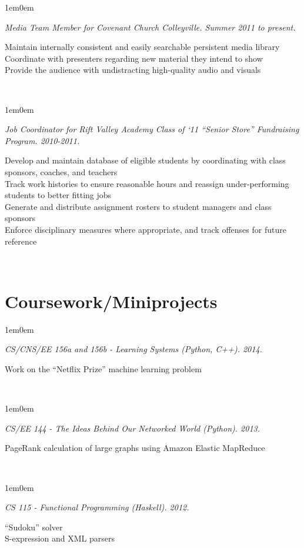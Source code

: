 \documentclass[10pt,letterpaper, full]{article}
\newcommand{\pjtitle}[1]{\renewcommand{\givenpjtitle}{#1}}
\newcommand{\pjtime}[1]{\renewcommand{\givenpjtime}{#1}}
\newcommand{\pjbody}[1]{\renewcommand{\givenpjbody}{#1}}
\newcommand{\givenpjtitle}{REQUIRED!}
\newcommand{\givenpjtime}{REQUIRED!}
\newcommand{\givenpjbody}{REQUIRED!}
\newenvironment{projectenv}
    {
        \begin{adjustwidth}{1em}{0em}
    }
    {
        \textit{\givenpjtitle. \givenpjtime.}

        \begin{minipage}[l]{\textwidth}
            \givenpjbody%
        \end{minipage}\\%


        \end{adjustwidth}
    }
\begin{document}
\begin{projectenv}%
    \pjtitle{Media Team Member for Covenant Church Colleyville}
    \pjtime{Summer 2011 to present}
    \pjbody{
        Maintain internally consistent and easily searchable persistent media library\\
        Coordinate with presenters regarding new material they intend to show\\
        Provide the audience with undistracting high-quality audio and visuals
    }
\end{projectenv}%

\begin{projectenv}%
    \pjtitle{Job Coordinator for Rift Valley Academy Class of ‘11 “Senior Store” Fundraising Program}
    \pjtime{2010-2011}
    \pjbody{
        Develop and maintain database of eligible students by coordinating with class sponsors, coaches, and teachers\\
        Track work histories to ensure reasonable hours and reassign under-performing students to better fitting jobs\\
        Generate and distribute assignment rosters to student managers and class sponsors\\
        Enforce disciplinary measures where appropriate, and track offenses for future reference
    }
\end{projectenv}%



\section{Coursework/Miniprojects}

\begin{projectenv}%
    \pjtitle{CS/CNS/EE 156a and 156b - Learning Systems (Python, C++)}
    \pjtime{2014}
    \pjbody{
        Work on the “Netflix Prize” machine learning problem
    }
\end{projectenv}%

\begin{projectenv}%
    \pjtitle{CS/EE 144 - The Ideas Behind Our Networked World (Python)}
    \pjtime{2013}
    \pjbody{
        PageRank calculation of large graphs using Amazon Elastic MapReduce
    }
\end{projectenv}%

\begin{projectenv}%
    \pjtitle{CS 115 - Functional Programming (Haskell)}
    \pjtime{2012}
    \pjbody{
        “Sudoku” solver\\
        S-expression and XML parsers\\
    }
\end{projectenv}%
\end{document}
